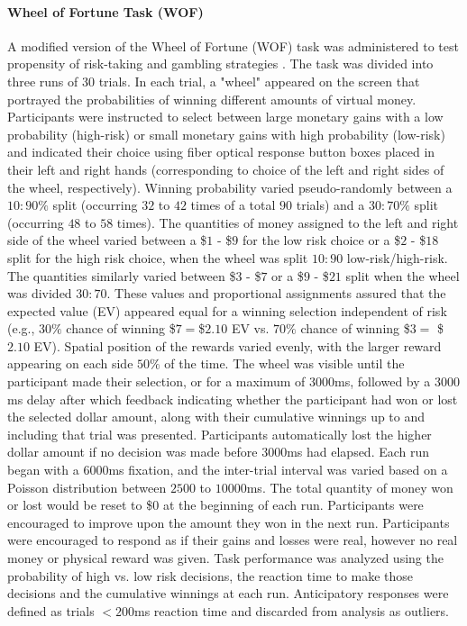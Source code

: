 \documentclass[utf8]{frontiersSCNS} %
\begin{document}
\paragraph{Wheel of Fortune Task (WOF)} A modified version of the Wheel of Fortune (WOF) task was administered to test propensity of risk-taking and gambling strategies \citep{ernst2004wheeloffortune}. The task was divided into three runs of 30 trials. In each trial, a "wheel" appeared on the screen that portrayed the probabilities of winning different amounts of virtual money. Participants were instructed to select between large monetary gains with a low probability (high-risk) or small monetary gains with high probability (low-risk) and indicated their choice using fiber optical response button boxes placed in their left and right hands (corresponding to choice of the left and right sides of the wheel, respectively). Winning probability varied pseudo-randomly between a $10:90\%$ split (occurring $32$ to $42$ times of a total $90$ trials) and a $30:70\%$ split (occurring $48$ to $58$ times). The quantities of money assigned to the left and right side of the wheel varied between a \$$1$ - \$$9$ for the low risk choice or a \$$2$ - \$$18$ split for the high risk choice, when the wheel was split $10:90$ low-risk/high-risk. The quantities similarly varied between \$$3$ - \$$7$ or a \$$9$ - \$$21$ split when the wheel was divided $30:70$.  These values and proportional assignments assured that the expected value (EV) appeared equal for a winning selection independent of risk (e.g., $30\%$ chance of winning \$$7 = $\$$2.10$ EV vs. $70\%$ chance of winning \$$3 =$ \$$2.10$ EV).  Spatial position of the rewards varied evenly, with the larger reward appearing on each side $50\%$ of the time.  The wheel was visible until the participant made their selection, or for a maximum of $3000$ms, followed by a $3000$ms delay after which feedback indicating whether the participant had won or lost the selected dollar amount, along with their cumulative winnings up to and including that trial was presented.  Participants automatically lost the higher dollar amount if no decision was made before $3000$ms had elapsed.  Each run began with a $6000$ms fixation, and the inter-trial interval was varied based on a Poisson distribution between $2500$ to $10000$ms. The total quantity of money won or lost would be reset to \$$0$ at the beginning of each run. Participants were encouraged to improve upon the amount they won in the next run.  Participants were encouraged to respond as if their gains and losses were real, however no real money or physical reward was given. Task performance was analyzed using the probability of high vs. low risk decisions, the reaction time to make those decisions and the cumulative winnings at each run. Anticipatory responses were defined as trials $<200$ms reaction time and discarded from analysis as outliers.
\end{document}
